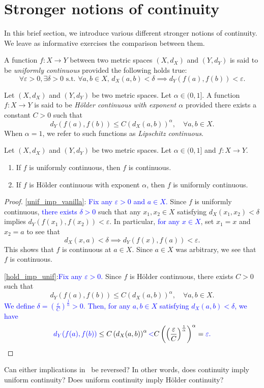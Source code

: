 \section{Stronger notions of continuity}
\label{sec:strong_cts}
In this brief section, we introduce various different stronger notions of continuity. We leave as informative exercises the comparison between them.
\begin{defn}
	\label{defn:unif_cty}
	A function $f:X\to Y$ between two metric spaces $(X,d_X)$ and $(Y,d_Y)$ is said to be \textit{uniformly continuous} provided the following holds true:
	\[
		\forall \varepsilon>0,\exists \delta>0\text{ s.t. }\forall a,b\in X, \, d_X(a,b) < \delta \implies d_Y(f(a),f(b))<\varepsilon.
	\]
\end{defn}
\begin{defn}
	\label{defn:holder}
	Let $(X,d_X)$ and $(Y,d_Y)$ be two metric spaces. Let $\alpha \in (0,1]$. A function $f: X\to Y$ is said to be \textit{H\"older continuous with exponent $\alpha$} provided there exists a constant $C>0$ such that
	\[
	d_Y(f(a),f(b))\le C\left(d_X(a,b)\right)^\alpha,\quad \forall a,b\in X.
	\]
	When $\alpha =1$, we refer to such functions as \textit{Lipschitz continuous}.
\end{defn}
\begin{lemma}
	\label{lem:cty_hierarchy}
	Let $(X,d_X)$ and $(Y,d_Y)$ be two metric spaces. Let $\alpha \in (0,1]$ and $f:X\to Y$.
	\begin{enumerate}
		\item \label{unif_imp_vanilla} If $f$ is uniformly continuous, then $f$ is continuous.
		\item \label{hold_imp_unif} If $f$ is H\"older continuous with exponent $\alpha$, then $f$ is uniformly continuous.
	\end{enumerate}
\end{lemma}
\begin{proof}
	\ref{unif_imp_vanilla}: \textcolor{blue}{Fix any $\varepsilon>0$ and $a\in X$.} Since $f$ is uniformly continuous, \textcolor{blue}{there exists $\delta>0$} such that any $x_1,x_2\in X$ satisfying $d_X(x_1,x_2)<\delta$ implies $d_Y(f(x_1),f(x_2))<\varepsilon$. In particular, \textcolor{blue}{for any $x\in X$}, set $x_1 = x$ and $x_2 = a$ to see that
	{\color{blue}
	\[
	d_X(x,a)<\delta \implies d_Y(f(x),f(a))<\varepsilon.
	\]
	}
	This shows that $f$ is continuous at $a\in X$. Since $a\in X$ was arbitrary, we see that $f$ is continuous.
	
	\ref{hold_imp_unif}:\textcolor{blue}{Fix any $\varepsilon>0$.} Since $f$ is H\"older continuous, there exists $C>0$ such that
	\[
	d_Y(f(a),f(b))\le C\left(d_X(a,b)\right)^\alpha,\quad \forall a,b\in X.
	\]
	\textcolor{blue}{We define $\delta = \left(\frac{\varepsilon}{C}\right)^\frac{1}{\alpha}>0$. Then, for any $a,b\in X$ satisfying $d_X(a,b)<\delta$, we have
	}
	\[
	\textcolor{blue}{d_Y(f(a),f(b))}\le C\left(d_X(a,b)\right)^\alpha \textcolor{blue}{<}C\left(\left(\frac{\varepsilon}{C}\right)^\frac{1}{\alpha}\right)^\alpha = \textcolor{blue}{\varepsilon.}
	\]
\end{proof}
\begin{ex}
	\label{ex:cts_counter}
	Can either implications in~ be reversed? In other words, does continuity imply uniform continuity? Does uniform continuity imply H\"older continuity?
\end{ex}